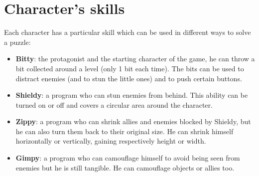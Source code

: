 \documentclass[12pt, a4paper]{report}
\begin{document}
\section*{Character’s skills}
Each character has a particular skill which can be used in different ways to solve a puzzle:
\begin{itemize}
	\item \textbf{Bitty}: the protagonist and the starting character of the game, he can throw a bit collected around a level (only 1 bit each time). The bits can be used to distract enemies (and to stun the little ones) and to push certain buttons.
	\item \textbf{Shieldy}: a program who can stun enemies from behind. This ability can be turned on or off and covers a circular area around the character.
	\item \textbf{Zippy}:  a program who can shrink allies and enemies blocked by Shieldy, but he can also turn them back to their original size. He can shrink himself horizontally or vertically, gaining respectively height or width.
	\item \textbf{Gimpy}: a program who can camouflage himself to avoid being seen from enemies but he is still tangible. He can camouflage objects or allies too.
\end{itemize}
\end{document}
